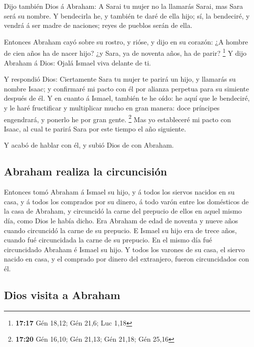  Dijo también Dios á Abraham: A Sarai tu mujer no la
llamarás Sarai, mas Sara será su nombre.  Y bendecirla
he, y también te daré de ella hijo; sí, la bendeciré, y vendrá á ser
madre de naciones; reyes de pueblos serán de ella.

 Entonces Abraham cayó sobre su rostro, y rióse, y dijo
en su corazón: ¿A hombre de cien años ha de nacer hijo? ¿y Sara, ya de
noventa años, ha de parir? \footnote{\textbf{17:17} Gén 18,12; Gén 21,6;
  Luc 1,18}  Y dijo Abraham á Dios: Ojalá Ismael viva
delante de ti.

 Y respondió Dios: Ciertamente Sara tu mujer te parirá un
hijo, y llamarás su nombre Isaac; y confirmaré mi pacto con él por
alianza perpetua para su simiente después de él.  Y en
cuanto á Ismael, también te he oído: he aquí que le bendeciré, y le haré
fructificar y multiplicar mucho en gran manera: doce príncipes
engendrará, y ponerlo he por gran gente. \footnote{\textbf{17:20} Gén
  16,10; Gén 21,13; Gén 21,18; Gén 25,16}  Mas yo
estableceré mi pacto con Isaac, al cual te parirá Sara por este tiempo
el año siguiente.

 Y acabó de hablar con él, y subió Dios de con Abraham.

\hypertarget{abraham-realiza-la-circuncisiuxf3n}{%
\subsection{Abraham realiza la
circuncisión}\label{abraham-realiza-la-circuncisiuxf3n}}

 Entonces tomó Abraham á Ismael su hijo, y á todos los
siervos nacidos en su casa, y á todos los comprados por su dinero, á
todo varón entre los domésticos de la casa de Abraham, y circuncidó la
carne del prepucio de ellos en aquel mismo día, como Dios le había
dicho.  Era Abraham de edad de noventa y nueve años
cuando circuncidó la carne de su prepucio.  E Ismael su
hijo era de trece años, cuando fué circuncidada la carne de su prepucio.
 En el mismo día fué circuncidado Abraham é Ismael su
hijo.  Y todos los varones de su casa, el siervo nacido
en casa, y el comprado por dinero del extranjero, fueron circuncidados
con él.

\hypertarget{dios-visita-a-abraham}{%
\subsection{Dios visita a Abraham}\label{dios-visita-a-abraham}}

